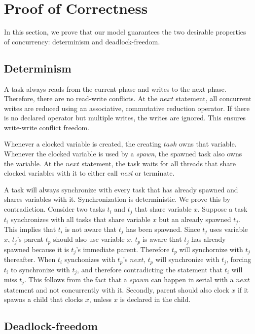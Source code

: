 \documentclass[10pt, conference, compsocconf]{IEEEtran}
\begin{document}
\section{Proof of Correctness}
\label{sec:proof}
In this section, we prove that our model guarantees the two desirable properties of concurrency: determinism
and deadlock-freedom.

\subsection{Determinism}
A task always reads from the current phase and writes to the next phase.
Therefore, there are no read-write conflicts.
At the $next$ statement, all concurrent writes are reduced using an associative, commutative
reduction operator. If there is no declared operator but multiple writes,
the writes are ignored. This ensures write-write conflict freedom.

Whenever a clocked variable is created, the creating $task$ owns that
variable. Whenever the clocked variable is used by a \emph{spawn}, the spawned
task also owns the variable. At the $next$ statement, the task waits for all 
threads that share clocked variables with it to either call \emph{next} or terminate.

A task will always synchronize with every task that has already spawned and shares variables with it. Synchronization is deterministic.
We prove this by contradiction. Consider two tasks $t_i$ and $t_j$
that share variable $x$. Suppose a task $t_i$ synchronizes with 
all tasks that share variable $x$  but an already spawned $t_j$.
This implies that $t_i$ is not aware that $t_j$ has been spawned.
Since $t_j$ uses variable $x$, $t_j$'s parent $t_p$ should
also use variable $x$.  $t_p$ is aware that $t_j$ has already spawned because
it is $t_j$'s immediate parent. Therefore $t_p$ will synchornize with $t_j$ thereafter. 
When $t_i$ synchonizes with $t_p$'s $next$, $t_p$ will synchronize with $t_j$, 
forcing $t_i$ to synchronize with $t_j$, and therefore  contradicting the statement that $t_i$ will
miss $t_j$. This follows from the fact that a $spawn$ can happen in serial with a $next$ statement
and not concurrently with it.  Secondly, parent should also clock  $x$ if it spawns a child 
that clocks $x$, unless $x$ is declared in the child.


\subsection{Deadlock-freedom}
\end{document}
